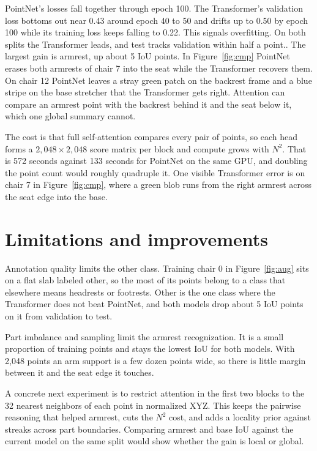 \documentclass[11pt]{article}
\begin{document}
PointNet's losses fall together through epoch 100. The Transformer's validation loss bottoms out near 0.43 around epoch 40 to 50 and drifts up to 0.50 by epoch 100 while its training loss keeps falling to 0.22. This signals overfitting. On both splits the Transformer leads, and test tracks validation within half a point.. The largest gain is armrest, up about 5 IoU points. In Figure~\ref{fig:cmp} PointNet erases both armrests of chair 7 into the seat while the Transformer recovers them. On chair 12 PointNet leaves a stray green patch on the backrest frame and a blue stripe on the base stretcher that the Transformer gets right. Attention can compare an armrest point with the backrest behind it and the seat below it, which one global summary cannot.

The cost is that full self-attention compares every pair of points, so each head forms a $2{,}048 \times 2{,}048$ score matrix per block and compute grows with $N^2$. That is 572 seconds against 133 seconds for PointNet on the same GPU, and doubling the point count would roughly quadruple it. One visible Transformer error is on chair 7 in Figure~\ref{fig:cmp}, where a green blob runs from the right armrest across the seat edge into the base.

\section{Limitations and improvements}

Annotation quality limits the other class. Training chair 0 in Figure~\ref{fig:aug} sits on a flat slab labeled other, so the most of its points belong to a class that elsewhere means headrests or footrests. Other is the one class where the Transformer does not beat PointNet, and both models drop about 5 IoU points on it from validation to test.

Part imbalance and sampling limit the armrest recognization. It is a small proportion of training points and stays the lowest IoU for both models. With 2{,}048 points an arm support is a few dozen points wide, so there is little margin between it and the seat edge it touches.

A concrete next experiment is to restrict attention in the first two blocks to the 32 nearest neighbors of each point in normalized XYZ. This keeps the pairwise reasoning that helped armrest, cuts the $N^2$ cost, and adds a locality prior against streaks across part boundaries. Comparing armrest and base IoU against the current model on the same split would show whether the gain is local or global.
\end{document}
